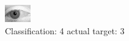 \begin{figure}[h!]
\begin{center}
\includegraphics[width=0.60\columnwidth]{figures/ID2820_class_4_target_3.png}
\end{center}
\caption{ Classification: 4 actual target: 3}
\label{fig:ID2820_class_4_target_3}
\end{figure}
